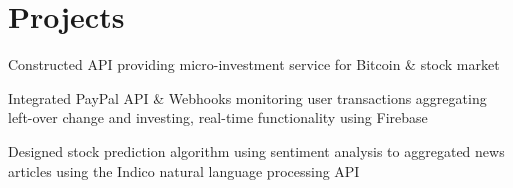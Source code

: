 \begin{minipage}[t]{0.66\textwidth}
\begin{tightitemize}
        \end{tightitemize}






        \section{Projects}


        \begin{tightitemize}
                \item Constructed API providing micro-investment service for Bitcoin \& stock market
                \item Integrated PayPal API \& Webhooks monitoring user transactions aggregating left-over change and investing, real-time functionality using Firebase
                \item Designed stock prediction algorithm using sentiment analysis to aggregated 
                        news articles using the Indico natural language processing API
        \end{tightitemize}

        \sectionspace %




\end{minipage}

